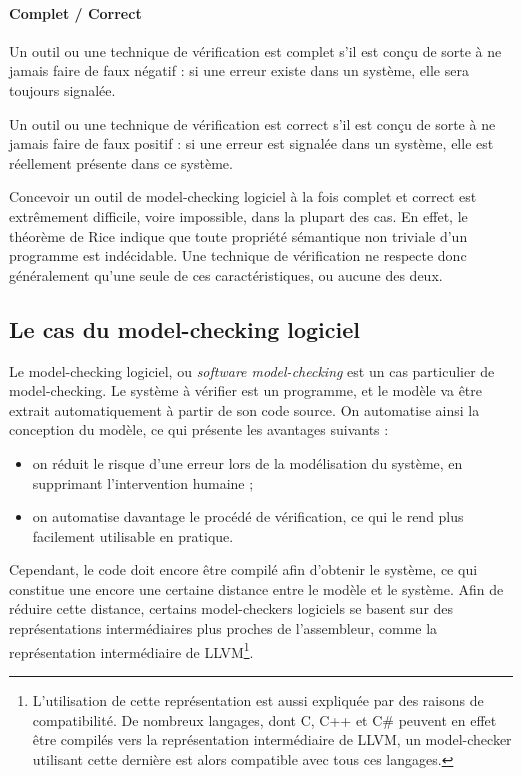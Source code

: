 \paragraph{Complet / Correct}

Un outil ou une technique de vérification est complet s’il est conçu de sorte à
ne jamais faire de faux négatif : si une erreur existe dans un système, elle
sera toujours signalée.

Un outil ou une technique de vérification est correct s’il est conçu de sorte à
ne jamais faire de faux positif : si une erreur est signalée dans un système,
elle est réellement présente dans ce système.

Concevoir un outil de model-checking logiciel à la fois complet et correct est
extrêmement difficile, voire impossible, dans la plupart des cas. En effet, le
théorème de Rice indique que toute propriété sémantique non triviale d'un
programme est indécidable. Une technique de vérification ne respecte donc généralement
qu'une seule de ces caractéristiques, ou aucune des deux.

\subsection{Le cas du model-checking logiciel}

Le model-checking logiciel, ou \emph{software model-checking} est un cas
particulier de model-checking. Le système à vérifier est un programme, et le
modèle va être extrait automatiquement à partir de son code source.
On automatise ainsi la conception du modèle, ce qui présente les avantages
suivants :

\begin{itemize}
\item
  on réduit le risque d'une erreur lors de la modélisation du système,
  en supprimant l'intervention humaine ;
\item
  on automatise davantage le procédé de vérification, ce qui le rend
  plus facilement utilisable en pratique.
\end{itemize}

Cependant, le code doit encore être compilé afin d'obtenir le système,
ce qui constitue une encore une certaine distance entre le modèle et le
système. Afin de réduire cette distance, certains
model-checkers logiciels se basent sur des représentations intermédiaires
plus proches de l'assembleur, comme la représentation intermédiaire de
LLVM\footnote{L'utilisation de cette représentation est aussi expliquée
  par des raisons de compatibilité. De nombreux langages, dont C, C++ et
  C\# peuvent en effet être compilés vers la représentation
  intermédiaire de LLVM, un model-checker utilisant cette dernière est
  alors compatible avec tous ces langages.}.

